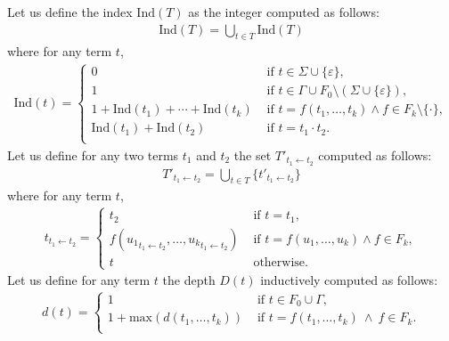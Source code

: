 \documentclass[a4paper]{llncs}
\begin{document}
  \begin{definition}
        Let us define the index $\mathrm{Ind}(T)$ as the integer computed as follows:
        \begin{align*}
          \mathrm{Ind}(T)=\bigcup_{t\in T} \mathrm{Ind}(T)
        \end{align*}
        where for any term $t$,
        \begin{align*}
        \mathrm{Ind}(t)=
        \begin{cases}
            0 & \text{ if } t\in \Sigma \cup\{\varepsilon\},\\
            1 & \text{ if } t\in \Gamma\cup F_0\setminus(\Sigma\cup\{\varepsilon\}),\\
            1 + \mathrm{Ind}(t_1)+\cdots +\mathrm{Ind}(t_k) & \text{ if } t=f(t_1,\ldots,t_k)\wedge f\in F_k\setminus\{\cdot\},\\
            \mathrm{Ind}(t_1)+\mathrm{Ind}(t_2) & \text{ if } t=t_1\cdot t_2.\\
          \end{cases}
        \end{align*}
    Let us define for any two terms $t_1$ and $t_2$ the set $T'_{t_1\leftarrow t_2}$ computed as follows:
        \begin{align*}
          T'_{t_1\leftarrow t_2}=\bigcup_{t\in T} \{t'_{t_1\leftarrow t_2}\}
        \end{align*}
        where for any term $t$,
        \begin{align*}
        t_{t_1\leftarrow t_2}=
        \begin{cases}
            t_2 & \text{ if }t=t_1,\\
            f({u_1}_{t_1\leftarrow t_2},\ldots,{u_k}_{t_1\leftarrow t_2}) & \text{ if } t=f(u_1,\ldots,u_k)\wedge f\in F_k,\\
            t & \text{ otherwise.}
          \end{cases}
        \end{align*}
    Let us define for any term $t$ the depth $D(t)$ inductively computed as follows:
        \begin{align*}
        d(t)=
        \begin{cases}
            1 & \text{ if }t \in F_0\cup\Gamma,\\
            1+\mathrm{max}(d(t_1,\ldots,t_k)) & \text{ if }t=f(t_1,\ldots,t_k)\ \wedge\ f\in F_k.\\
          \end{cases}
        \end{align*}
  \end{definition}
  
\end{document}
